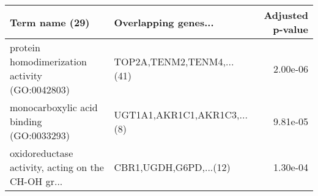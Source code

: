 \begin{tabular}{llr}
\toprule
                                    Term name (29) &        Overlapping genes... &  Adjusted p-value \\
\midrule
    protein homodimerization activity (GO:0042803) &   TOP2A,TENM2,TENM4,...(41) &          2.00e-06 \\
          monocarboxylic acid binding (GO:0033293) & UGT1A1,AKR1C1,AKR1C3,...(8) &          9.81e-05 \\
oxidoreductase activity, acting on the CH-OH gr... &      CBR1,UGDH,G6PD,...(12) &          1.30e-04 \\
\bottomrule
\end{tabular}
